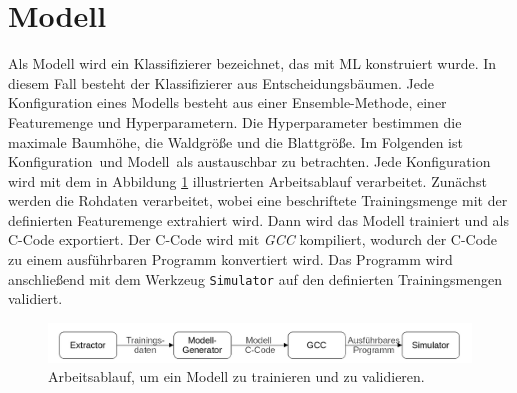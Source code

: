\section{Modell}
Als Modell wird ein Klassifizierer bezeichnet, das mit ML konstruiert wurde. In diesem Fall besteht der Klassifizierer aus Entscheidungsbäumen. Jede Konfiguration eines Modells besteht aus einer
Ensemble-Methode, einer Featuremenge und Hyperparametern. Die Hyperparameter bestimmen die maximale Baumhöhe, die Waldgröße und die Blattgröße. Im Folgenden ist \glqq Konfiguration\grqq\ und \glqq Modell\grqq\
als austauschbar zu betrachten.
\newline
\newline
Jede Konfiguration wird mit dem in Abbildung \ref{fig:model_workflow} illustrierten Arbeitsablauf verarbeitet. Zunächst werden die Rohdaten verarbeitet, wobei eine beschriftete Trainingsmenge mit der definierten
Featuremenge extrahiert wird. Dann wird das Modell trainiert und als C-Code exportiert. Der C-Code wird mit \textit{GCC} kompiliert, wodurch der C-Code zu einem ausführbaren Programm konvertiert wird. Das Programm
wird anschließend mit dem Werkzeug \texttt{Simulator} auf den definierten Trainingsmengen validiert.
\begin{figure}
    \centering
    \includegraphics[width=\linewidth]{images/model_workflow.jpg}
    \caption{Arbeitsablauf, um ein Modell zu trainieren und zu validieren.}
    \label{fig:model_workflow}
\end{figure}


